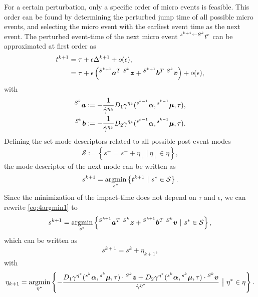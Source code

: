 \documentclass[../DC2017114Bouma.tex]{subfiles}
\begin{document}
For a certain perturbation, only a specific order of micro events is feasible. This order can be found by determining the perturbed jump time of all possible micro events, and selecting the micro event with the earliest event time as the next event. The perturbed event-time of the next micro event $\hspace{0cm}^{s^{k+1} \leftarrow S^{k}}t^\epsilon$ can be approximated at first order as
\begin{align}
t^{k+1} &= \tau + \epsilon\Delta^{k+1} + o(\epsilon),\\
&= \tau + \epsilon\left(\hspace{0cm}^{S^{k+1}}{\boldsymbol{a}}^T\ \hspace{0cm}^{S^k}{\boldsymbol{z}} +\hspace{0cm}^{S^{k+1}}{\boldsymbol{b}}^T\ \hspace{0cm}^{S^k}{\boldsymbol{v}}\right) + o(\epsilon),
\end{align}
with
\begin{align*}
\hspace{0cm}^{S^k}{\boldsymbol{a}} &:= -\frac{1}{\dot{\gamma}^{\eta_k}}D_1\gamma^{\eta_k}(\hspace{0cm}^{s^{k-1}}\boldsymbol{\alpha},\hspace{0cm}^{s^{k-1}}\boldsymbol{\mu},\tau),\\
\hspace{0cm}^{S^k}{\boldsymbol{b}} &:= -\frac{1}{\dot{\gamma}^{\eta_k}}D_2\gamma^{\eta_k}(\hspace{0cm}^{s^{k-1}}\boldsymbol{\alpha},\hspace{0cm}^{s^{k-1}}\boldsymbol{\mu},\tau).
\end{align*}
Defining the set mode descriptors related to all possible post-event modes 
\begin{align}
\mathcal{S} := \left\{ s^+ = s^- + \eta_+ \ |\ \eta_+\in \eta \right\},
\end{align}
the mode descriptor of the next mode can be written as
%
\begin{align}
s^{k+1} = \underset{s^{\ast}}{\argmin}\left\{t^{k+1}\ |\ s^{\ast}\in\mathcal{S}\right\}.\label{eq:4argmin1}
\end{align}
Since the minimization of the impact-time does not depend on $\tau$ and $\epsilon$, we can rewrite \eqref{eq:4argmin1} to
\begin{align}
s^{k+1} = \underset{s^{\ast}}{\argmin}\left\{\ls^{S^{k+1}}\ab^T\ \ls^{S^k}\zb +\ls^{S^{k+1}}\bb^T\ \ls^{S^k}\vb\ |\ s^{\ast}\in\mathcal{S}\right\},
\end{align}
which can be written as
\begin{align}
s^{k+1} = s^k + \eta_{k+1},
\end{align}
with 
\begin{align}
\eta_{k+1} = \underset{\eta^\ast}{\argmin}\left\{-\frac{D_1\gamma^{\eta^\ast}(\ls^{s^k}\alphab,\ls^{s^k}\mub,\tau)\cdot\ls^{S^k}\zb + D_2\gamma^{\eta^\ast}(\ls^{s^k}\alphab,\ls^{s^k}\mub,\tau)\cdot\ls^{S^k}\vb}{\dot{\gamma}^{\eta^\ast}}\ \big|\ \eta^{\ast}\in\eta\right\}.\label{eq:4argmin2}
\end{align}
\end{document}
